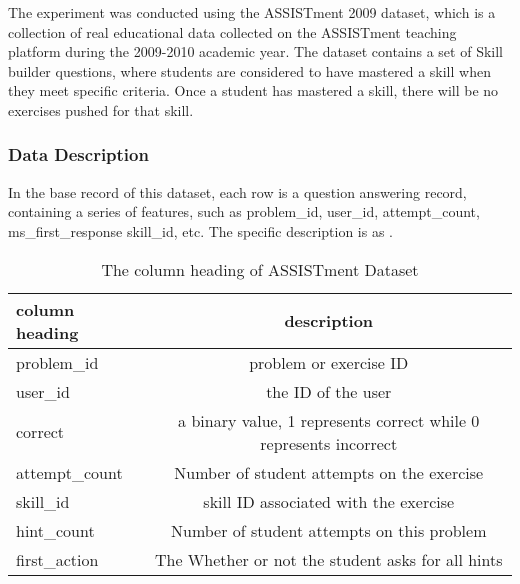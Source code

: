The experiment was conducted using the ASSISTment 2009 dataset, which is a collection of real educational data collected on the ASSISTment teaching platform during the 2009-2010 academic year. The dataset contains a set of Skill builder questions, where students are considered to have mastered a skill when they meet specific criteria. Once a student has mastered a skill, there will be no exercises pushed for that skill.


\subsubsection{Data Description}

In the base record of this dataset, each row is a question answering record, containing a series of features, such as problem\_id, user\_id, attempt\_count, ms\_first\_response skill\_id, etc. The specific description is as \tblname{\ref{tbl:ch3-assist2009-heading}}.

\begin{table}[htbp!]
    \centering
    \caption{The column heading of ASSISTment Dataset}\label{tbl:ch3-assist2009-heading}
    \begin{tabular}{lc}
        \toprule
        column heading & description                                                       \\
        \midrule
        problem\_id    & problem or exercise ID                                            \\
        user\_id       & the ID of the user                                                \\
        correct        & a binary value, 1 represents correct while 0 represents incorrect \\
        attempt\_count & Number of student attempts on the exercise                        \\
        skill\_id      & skill ID associated with the exercise                             \\
        hint\_count    & Number of student attempts on this problem                        \\
        first\_action  & The Whether or not the student asks for all hints                 \\
        \bottomrule
    \end{tabular}
\end{table}

